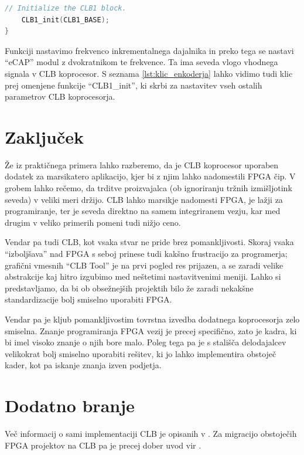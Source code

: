 \documentclass[a4paper]{article}
\begin{document}
\begin{sloppypar}
\begin{lstlisting}[language=C,
                   caption={Implementacija funkcije za nastavitev 
                            inkrementalnega dajalnika},
                   label={lst:klic_enkoderja}]
    // Initialize the CLB1 block.
    CLB1_init(CLB1_BASE);
}
\end{lstlisting}

Funkciji nastavimo frekvenco inkrementalnega dajalnika in preko tega se nastavi
``eCAP'' modul z dvokratnikom te frekvence. Ta ima seveda vlogo vhodnega
signala v CLB koprocesor. S seznama \ref{lst:klic_enkoderja} lahko vidimo tudi
klic prej omenjene funkcije ``CLB1\_init'', ki skrbi za nastavitev vseh ostalih
parametrov CLB koprocesorja.



\section{Zaključek}
Že iz praktičnega primera lahko razberemo, da je CLB koprocesor uporaben
dodatek za marsikatero aplikacijo, kjer bi z njim lahko nadomestili FPGA čip. V
grobem lahko rečemo, da trditve proizvajalca (ob ignoriranju tržnih
izmišljotink seveda) v veliki meri držijo. CLB lahko marsikje nadomesti FPGA,
je lažji za programiranje, ter je seveda direktno na samem integriranem vezju,
kar med drugim v veliko primerih pomeni tudi nižjo ceno.

Vendar pa tudi CLB, kot vsaka stvar ne pride brez pomankljivosti. Skoraj vsaka
``izboljšava'' nad FPGA s seboj prinese tudi kakšno frustracijo za programerja;
grafični vmesnih ``CLB Tool'' je na prvi pogled res prijazen, a se zaradi
velike abstrakcije kaj hitro izgubimo med neštetimi nastavitvenimi meniji.
Lahko si predstavljamo, da bi ob obsežnejših projektih bilo že zaradi nekakšne
standardizacije bolj smiselno uporabiti FPGA.

Vendar pa je kljub pomankljivostim tovrstna izvedba dodatnega koprocesorja zelo
smiselna. Znanje programiranja FPGA vezij je precej specifično, zato je kadra,
ki bi imel visoko znanje o njih bore malo. Poleg tega pa je s stališča
delodajalcev velikokrat bolj smiselno uporabiti rešitev, ki jo lahko
implementira obstoječ kader, kot pa iskanje znanja izven podjetja.

\section{Dodatno branje}
Več informacij o sami implementaciji CLB je opisanih v \cite{clb-designing}. Za
migracijo obstoječih FPGA projektov na CLB pa je precej dober uvod vir
\cite{fpga-to-clb}.

\printbibliography
\end{sloppypar}
\end{document}

